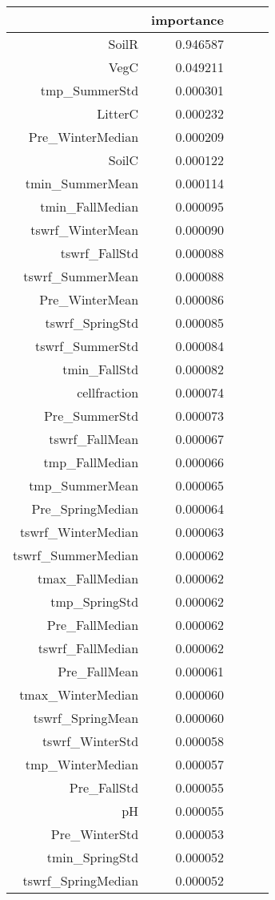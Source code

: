 \begin{tabular}{rrrrr}
\toprule
 & importance \\
\midrule
SoilR & 0.946587 \\
VegC & 0.049211 \\
tmp_SummerStd & 0.000301 \\
LitterC & 0.000232 \\
Pre_WinterMedian & 0.000209 \\
SoilC & 0.000122 \\
tmin_SummerMean & 0.000114 \\
tmin_FallMedian & 0.000095 \\
tswrf_WinterMean & 0.000090 \\
tswrf_FallStd & 0.000088 \\
tswrf_SummerMean & 0.000088 \\
Pre_WinterMean & 0.000086 \\
tswrf_SpringStd & 0.000085 \\
tswrf_SummerStd & 0.000084 \\
tmin_FallStd & 0.000082 \\
cellfraction & 0.000074 \\
Pre_SummerStd & 0.000073 \\
tswrf_FallMean & 0.000067 \\
tmp_FallMedian & 0.000066 \\
tmp_SummerMean & 0.000065 \\
Pre_SpringMedian & 0.000064 \\
tswrf_WinterMedian & 0.000063 \\
tswrf_SummerMedian & 0.000062 \\
tmax_FallMedian & 0.000062 \\
tmp_SpringStd & 0.000062 \\
Pre_FallMedian & 0.000062 \\
tswrf_FallMedian & 0.000062 \\
Pre_FallMean & 0.000061 \\
tmax_WinterMedian & 0.000060 \\
tswrf_SpringMean & 0.000060 \\
tswrf_WinterStd & 0.000058 \\
tmp_WinterMedian & 0.000057 \\
Pre_FallStd & 0.000055 \\
pH & 0.000055 \\
Pre_WinterStd & 0.000053 \\
tmin_SpringStd & 0.000052 \\
tswrf_SpringMedian & 0.000052 \\

\end{tabular}
